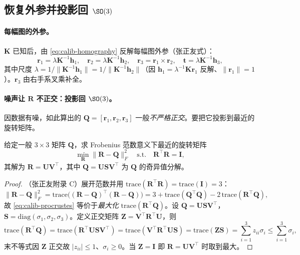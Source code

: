 \subsection{恢复外参并投影回 \texorpdfstring{$\SO(3)$}{(3)}}
\label{sec:calib-extrinsics}

\paragraph{每幅图的外参。}
$\mathbf{K}$ 已知后，由 \cref{eq:calib-homography} 反解每幅图外参（张正友式\cite{zhang2000calibration}）：
\begin{equation}
  \mathbf{r}_1=\lambda\mathbf{K}^{-1}\mathbf{h}_1,\quad
  \mathbf{r}_2=\lambda\mathbf{K}^{-1}\mathbf{h}_2,\quad
  \mathbf{r}_3=\mathbf{r}_1\times\mathbf{r}_2,\quad
  \mathbf{t}=\lambda\mathbf{K}^{-1}\mathbf{h}_3,
  \label{eq:calib-extrinsics}
\end{equation}
其中尺度 $\lambda=1/\|\mathbf{K}^{-1}\mathbf{h}_1\|=1/\|\mathbf{K}^{-1}\mathbf{h}_2\|$（因 $\mathbf{h}_1=\lambda^{-1}\mathbf{K}\mathbf{r}_1$ 反解、$\|\mathbf{r}_1\|=1$）。$\mathbf{r}_3$ 由右手系叉乘补全。

\paragraph{噪声让 $\mathbf{R}$ 不正交：投影回 $\SO(3)$。}
因数据有噪，如此算出的 $\mathbf{Q}=[\mathbf{r}_1,\mathbf{r}_2,\mathbf{r}_3]$ 一般\emph{不严格正交}。要把它投影到最近的旋转矩阵。

\begin{theorem}\label{thm:calib-nearest-rotation}
给定一般 $3\times3$ 矩阵 $\mathbf{Q}$，求 Frobenius 范数意义下最近的旋转矩阵
\begin{equation}
  \min_{\mathbf{R}}\|\mathbf{R}-\mathbf{Q}\|_F^2\quad\text{s.t.}\quad \mathbf{R}^\top\mathbf{R}=\mathbf{I},
  \label{eq:calib-procrustes}
\end{equation}
其解为 $\mathbf{R}=\mathbf{U}\mathbf{V}^\top$，其中 $\mathbf{Q}=\mathbf{U}\mathbf{S}\mathbf{V}^\top$ 为 $\mathbf{Q}$ 的奇异值分解。
\end{theorem}
\begin{proof}
（张正友附录 C\cite{zhang2000calibration}）展开范数并用 $\mathrm{trace}(\mathbf{R}^\top\mathbf{R})=\mathrm{trace}(\mathbf{I})=3$：
\[
  \|\mathbf{R}-\mathbf{Q}\|_F^2=\mathrm{trace}\big((\mathbf{R}-\mathbf{Q})^\top(\mathbf{R}-\mathbf{Q})\big)=3+\mathrm{trace}(\mathbf{Q}^\top\mathbf{Q})-2\,\mathrm{trace}(\mathbf{R}^\top\mathbf{Q}),
\]
故 \cref{eq:calib-procrustes} 等价于\emph{最大化} $\mathrm{trace}(\mathbf{R}^\top\mathbf{Q})$。设 $\mathbf{Q}=\mathbf{U}\mathbf{S}\mathbf{V}^\top$，$\mathbf{S}=\mathrm{diag}(\sigma_1,\sigma_2,\sigma_3)$。定义正交矩阵 $\mathbf{Z}=\mathbf{V}^\top\mathbf{R}^\top\mathbf{U}$，则
\[
  \mathrm{trace}(\mathbf{R}^\top\mathbf{Q})=\mathrm{trace}(\mathbf{R}^\top\mathbf{U}\mathbf{S}\mathbf{V}^\top)=\mathrm{trace}(\mathbf{V}^\top\mathbf{R}^\top\mathbf{U}\mathbf{S})=\mathrm{trace}(\mathbf{Z}\mathbf{S})=\sum_{i=1}^3 z_{ii}\sigma_i\le\sum_{i=1}^3\sigma_i,
\]
末不等式因 $\mathbf{Z}$ 正交故 $|z_{ii}|\le1$、$\sigma_i\ge0$。当 $\mathbf{Z}=\mathbf{I}$ 即 $\mathbf{R}=\mathbf{U}\mathbf{V}^\top$ 时取到最大。
\end{proof}

